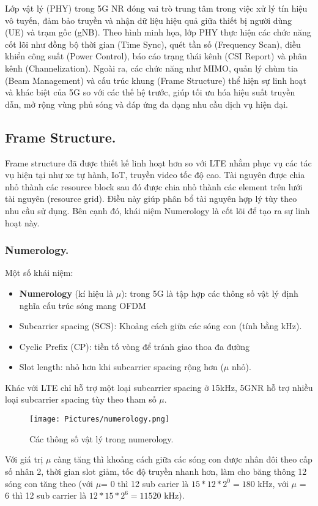 Lớp vật lý (PHY) trong 5G NR đóng vai trò trung tâm trong việc xử lý tín hiệu vô tuyến, đảm bảo truyền và nhận dữ liệu hiệu quả giữa thiết bị người dùng (UE) và trạm gốc (gNB). Theo hình minh họa, lớp PHY thực hiện các chức năng cốt lõi như đồng bộ thời gian (Time Sync), quét tần số (Frequency Scan), điều khiển công suất (Power Control), báo cáo trạng thái kênh (CSI Report) và phân kênh (Channelization). Ngoài ra, các chức năng như MIMO, quản lý chùm tia (Beam Management) và cấu trúc khung (Frame Structure) thể hiện sự linh hoạt và khác biệt của 5G so với các thế hệ trước, giúp tối ưu hóa hiệu suất truyền dẫn, mở rộng vùng phủ sóng và đáp ứng đa dạng nhu cầu dịch vụ hiện đại.

\subsection{Frame Structure.}
Frame structure đã được thiết kế linh hoạt hơn so với LTE nhằm phục vụ các tác vụ hiện tại như xe tự hành, IoT, truyền video tốc độ cao.
Tài nguyên được chia nhỏ thành các resource block sau đó được chia nhỏ thành các element trên lưới tài nguyên (resource grid). Điều này giúp phân bổ tài nguyên hợp lý tùy theo nhu cầu sử dụng. Bên cạnh đó, khái niệm Numerology là cốt lõi để tạo ra sự linh hoạt này.
\subsubsection{Numerology.}
Một số khái niệm: \begin{itemize}
    \item \textbf{Numerology} (kí hiệu là $\mu$): trong 5G là tập hợp các thông số vật lý định nghĩa cấu trúc sóng mang OFDM 
    \item Subcarrier spacing (SCS): Khoảng cách giữa các sóng con (tính bằng kHz).
    \item Cyclic Prefix (CP): tiền tố vòng để tránh giao thoa đa đường 
    \item Slot length: nhỏ hơn khi subcarrier spacing rộng hơn ($\mu$ nhỏ).
\end{itemize}
Khác với LTE chỉ hỗ trợ một loại subcarrier spacing ở 15kHz, 5GNR hỗ trợ nhiều loại subcarrier spacing tùy theo tham số $\mu$. 
\begin{figure}[H]
    \centering
    \texttt{[image: Pictures/numerology.png]}
    \caption{Các thông số vật lý trong numerology.\cite{ShareTechnote_5GNR_nume}}
\end{figure}
Với giá trị $\mu$ càng tăng thì khoảng cách giữa các sóng con được nhân đôi theo cấp số nhân 2, thời gian slot giảm, tốc độ truyền nhanh hơn, làm cho băng thông 12 sóng con tăng theo (với $\mu$= 0 thì 12 sub carier là $ 15*12*2^0 = 180$ kHz, với $\mu$ = 6 thì 12 sub carrier là $12* 15* 2^6 = 11520$ kHz).



